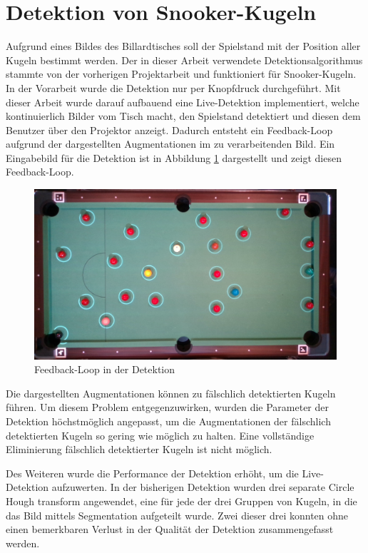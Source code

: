 \newpage
\section{Detektion von Snooker-Kugeln}\label{kap:detektion}
Aufgrund eines Bildes des Billardtisches soll der Spielstand mit der Position aller Kugeln bestimmt werden.
Der in dieser Arbeit verwendete Detektionsalgorithmus stammte von der vorherigen Projektarbeit\cite{project2:snooker_detection}
und funktioniert für Snooker-Kugeln.
In der Vorarbeit wurde die Detektion nur per Knopfdruck durchgeführt.
Mit dieser Arbeit wurde darauf aufbauend eine Live-Detektion implementiert, welche kontinuierlich Bilder vom Tisch macht,
den Spielstand detektiert und diesen dem Benutzer über den Projektor anzeigt.
Dadurch entsteht ein Feedback-Loop aufgrund der dargestellten Augmentationen im zu verarbeitenden Bild.
Ein Eingabebild für die Detektion ist in Abbildung \ref{fig:detection_feedback_loop} dargestellt und zeigt diesen Feedback-Loop.

\begin{figure}[h!]
    \begin{center}
        \includegraphics[width=0.8\linewidth]{../common/03_billiard_ai/resources/detection_feedback_loop.png}
    \end{center}
    \caption{Feedback-Loop in der Detektion}
    \label{fig:detection_feedback_loop}
\end{figure}

Die dargestellten Augmentationen können zu fälschlich detektierten Kugeln führen.
Um diesem Problem entgegenzuwirken, wurden die Parameter der Detektion höchstmöglich angepasst, um die Augmentationen
der fälschlich detektierten Kugeln so gering wie möglich zu halten.
Eine vollständige Eliminierung fälschlich detektierter Kugeln ist nicht möglich.

Des Weiteren wurde die Performance der Detektion erhöht, um die Live-Detektion aufzuwerten.
In der bisherigen Detektion wurden drei separate Circle Hough transform\cite{wiki:circle_hough} angewendet, eine für
jede der drei Gruppen von Kugeln, in die das Bild mittels Segmentation aufgeteilt wurde\cite{project2:snooker_detection}.
Zwei dieser drei konnten ohne einen bemerkbaren Verlust in der Qualität der Detektion zusammengefasst werden.
